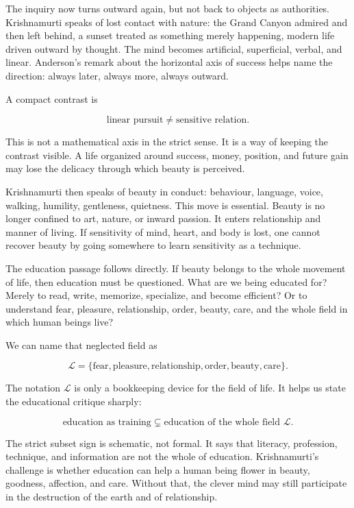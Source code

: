 The inquiry now turns outward again, but not back to objects as authorities. Krishnamurti speaks of lost contact with nature: the Grand Canyon admired and then left behind, a sunset treated as something merely happening, modern life driven outward by thought. The mind becomes artificial, superficial, verbal, and linear. Anderson's remark about the horizontal axis of success helps name the direction: always later, always more, always outward.

A compact contrast is

\begin{equation}
\text{linear pursuit}
\neq
\text{sensitive relation}.
\end{equation}

This is not a mathematical axis in the strict sense. It is a way of keeping the contrast visible. A life organized around success, money, position, and future gain may lose the delicacy through which beauty is perceived.

Krishnamurti then speaks of beauty in conduct: behaviour, language, voice, walking, humility, gentleness, quietness. This move is essential. Beauty is no longer confined to art, nature, or inward passion. It enters relationship and manner of living. If sensitivity of mind, heart, and body is lost, one cannot recover beauty by going somewhere to learn sensitivity as a technique.

The education passage follows directly. If beauty belongs to the whole movement of life, then education must be questioned. What are we being educated for? Merely to read, write, memorize, specialize, and become efficient? Or to understand fear, pleasure, relationship, order, beauty, care, and the whole field in which human beings live?

We can name that neglected field as

\begin{equation}
\mathcal{L}
=
\{\text{fear},\text{pleasure},\text{relationship},\text{order},
\text{beauty},\text{care}\}.
\end{equation}

The notation \(\mathcal{L}\) is only a bookkeeping device for the field of life. It helps us state the educational critique sharply:

\begin{equation}
\text{education as training}
\subsetneq
\text{education of the whole field } \mathcal{L}.
\end{equation}

The strict subset sign is schematic, not formal. It says that literacy, profession, technique, and information are not the whole of education. Krishnamurti's challenge is whether education can help a human being flower in beauty, goodness, affection, and care. Without that, the clever mind may still participate in the destruction of the earth and of relationship.

